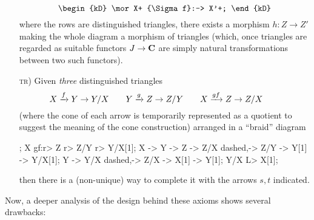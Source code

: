 \begin{definition}
\begin{enumerate}[label=\smallcap{pt} \oldstylenums{\arabic*})]
\[\begin{kD}
\mor X+ {\Sigma f}:-> X'+;
\end{kD}
\]
where the rows are distinguished triangles, there exists a morphism $h\colon Z\to Z'$ making the whole diagram a morphism of triangles (which, once triangles are regarded as suitable functors $J\to \mathbf{C}$ are simply natural transformations between two such functors).
\item[\textsc{tr})] \label{item:tr} Given \emph{three} distinguished triangles
\[
X\xrightarrow{f}Y\to Y/X\qquad
Y\xrightarrow{g}Z\to Z/Y\qquad
X\xrightarrow{gf}Z\to Z/X\qquad
\]
(where the cone of each arrow is temporarily represented as a quotient to suggest the meaning of the cone construction) arranged in a ``braid'' diagram
\begin{center}
\begin{kD}
;
\mor X gf:r> Z r> Z/Y r> Y/X[1];
\mor X -> Y -> Z -> Z/X dashed,-> Z/Y -> Y[1] -> Y/X[1];
\mor Y -> Y/X dashed,-> Z/X -> X[1] -> Y[1];
\mor Y/X L> X[1];
\end{kD}
\end{center}
then there is a (non\hyp{}unique) way to complete it with the arrows $s,t$ indicated.
\end{enumerate}
\end{definition}
Now, a deeper analysis of the design behind these axioms shows several drawbacks:
